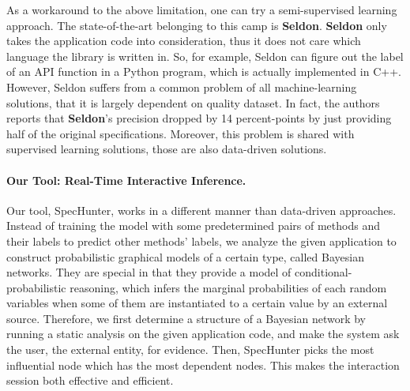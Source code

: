As a workaround to the above limitation, one can try a semi-supervised learning
approach. The state-of-the-art belonging to this camp is \textbf{Seldon}.
\textbf{Seldon} only takes the application code into consideration, thus it does
not care which language the library is written in. So, for example, Seldon can
figure out the label of an API function in a Python program, which is
actually implemented in C++. However, Seldon suffers from a common problem of
all machine-learning solutions, that it is largely dependent on quality dataset.
In fact, the authors reports that \textbf{Seldon}'s precision dropped by 14
percent-points by just providing half of the original specifications. Moreover,
this problem is shared with supervised learning solutions, those are also
data-driven solutions.

\paragraph{Our Tool: Real-Time Interactive Inference.}

Our tool, SpecHunter, works in a different manner than data-driven
approaches. Instead of training the model with some predetermined pairs of
methods and their labels to predict other methods' labels, we analyze the given
application to construct probabilistic graphical models of a certain type,
called Bayesian networks. They are special in that they provide a model of
conditional-probabilistic reasoning, which infers the marginal probabilities of
each random variables when some of them are instantiated to a certain value by
an external source. Therefore, we first determine a structure of a Bayesian network
by running a static analysis on the given application code, and make the system ask
the user, the external entity, for evidence. Then, SpecHunter picks the most
influential node which has the most dependent nodes. This makes the interaction
session both effective and efficient.


